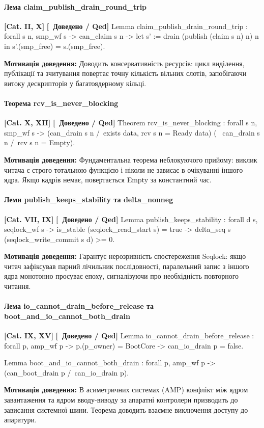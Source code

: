 \documentclass{article}
\let\originalfootnotesize\footnotesize
\let\oldverbatim\verbatim
\let\oldendverbatim\endverbatim
\renewenvironment{verbatim}{\originalfootnotesize\oldverbatim}{\oldendverbatim}
\newcommand{\thmcategory}[1]{{\small\textbf{\color{coreblue}[#1]}}}
\newcommand{\thmproven}{{\small\textbf{\color{productgreen}[\checkmark\ Доведено / Qed]}}}
\newcommand{\thmmotivation}[1]{%
  \par\smallskip\noindent\colorbox{boxbg}{\parbox{\dimexpr\linewidth-2\fboxsep\relax}{%
    \small\textbf{Мотивація доведення:} #1%
  }}\par\medskip
}
\begin{document}
\paragraph{Лема claim\_publish\_drain\_round\_trip} \thmcategory{Cat. II, X} \thmproven
\begin{verbatim}
Lemma claim_publish_drain_round_trip : forall s n,
  smp_wf s -> can_claim s n ->
  let s' := drain (publish (claim s n) n) n in
  s'.(smp_free) = s.(smp_free).
\end{verbatim}
\thmmotivation{Доводить консервативність ресурсів: цикл виділення, публікації та зчитування повертає точну кількість вільних слотів, запобігаючи витоку дескрипторів у багатоядерному кільці.}

\paragraph{Теорема rcv\_is\_never\_blocking} \thmcategory{Cat. X, XII} \thmproven
\begin{verbatim}
Theorem rcv_is_never_blocking : forall s n,
  smp_wf s ->
  (can_drain s n /\ exists data, rcv s n = Ready data) \/
  (~ can_drain s n /\ rcv s n = Empty).
\end{verbatim}
\thmmotivation{Фундаментальна теорема неблокуючого прийому: виклик читача є строго тотальною функцією і ніколи не зависає в очікуванні іншого ядра. Якщо кадрів немає, повертається Empty за константний час.}

\paragraph{Леми publish\_keeps\_stability та delta\_nonneg} \thmcategory{Cat. VII, IX} \thmproven
\begin{verbatim}
Lemma publish_keeps_stability : forall d s,
  seqlock_wf s ->
  is_stable (seqlock_read_start s) = true ->
  delta_seq s (seqlock_write_commit s d) >= 0.
\end{verbatim}
\thmmotivation{Гарантує нерозривність спостереження Seqlock: якщо читач зафіксував парний лічильник послідовності, паралельний запис з іншого ядра монотонно просуває епоху, сигналізуючи про необхідність повторного читання.}

\paragraph{Лема io\_cannot\_drain\_before\_release та boot\_and\_io\_cannot\_both\_drain} \thmcategory{Cat. IX, XV} \thmproven
\begin{verbatim}
Lemma io_cannot_drain_before_release : forall p,
  amp_wf p -> p.(p_owner) = BootCore ->
  can_io_drain p = false.

Lemma boot_and_io_cannot_both_drain : forall p,
  amp_wf p ->
  ~ (can_boot_drain p /\ can_io_drain p).
\end{verbatim}
\thmmotivation{В асиметричних системах (AMP) конфлікт між ядром завантаження та ядром вводу-виводу за апаратні контролери призводить до зависання системної шини. Теорема доводить взаємне виключення доступу до апаратури.}
\end{document}
